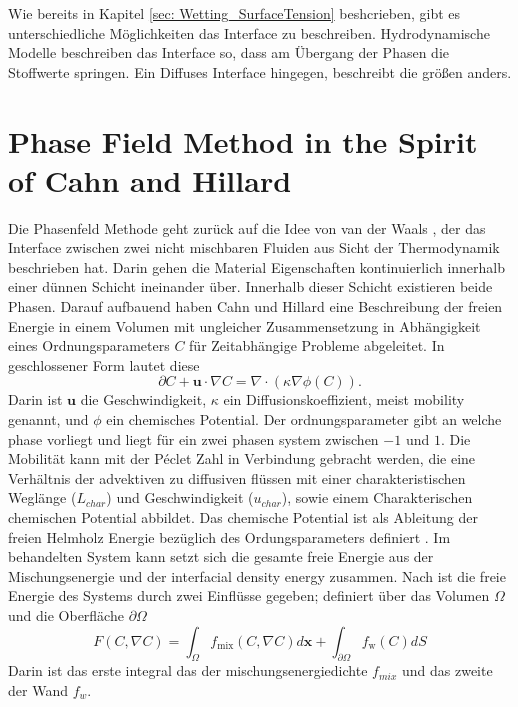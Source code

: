 
Wie bereits in Kapitel \ref{sec: Wetting_SurfaceTension} beshcrieben, gibt es unterschiedliche Möglichkeiten das Interface zu beschreiben. Hydrodynamische Modelle beschreiben das Interface so, dass am Übergang der Phasen die Stoffwerte springen. Ein Diffuses Interface hingegen, beschreibt die größen anders. 

\section{Phase Field Method in the Spirit of Cahn and Hillard}
Die Phasenfeld Methode geht zurück auf die Idee von van der Waals \cite{vanderwaals1979ThermodynamicTheoryCapillarity}, der das Interface zwischen zwei nicht mischbaren Fluiden aus Sicht der Thermodynamik beschrieben hat. Darin gehen die Material Eigenschaften kontinuierlich innerhalb einer dünnen Schicht ineinander über. Innerhalb dieser Schicht existieren beide Phasen. 
Darauf aufbauend haben Cahn und Hillard \cite{johnw.FreeEnergyNonuniform1958} eine Beschreibung der freien Energie in einem Volumen mit ungleicher Zusammensetzung in Abhängigkeit eines Ordnungsparameters $C$ für Zeitabhängige Probleme abgeleitet. In geschlossener Form lautet diese
\begin{equation}
\label{eq: CahnHillard}
    \partial C + \textbf{u} \cdot \nabla C = \nabla \cdot \left(\kappa \nabla \phi(C)\right).
\end{equation}
Darin ist $\textbf{u}$ die Geschwindigkeit, $\kappa$ ein Diffusionskoeffizient, meist mobility genannt, und $\phi$ ein chemisches Potential. Der ordnungsparameter gibt an welche phase vorliegt und liegt für ein zwei phasen system zwischen $-1$ und $1$. Die Mobilität kann mit der Péclet Zahl in Verbindung gebracht werden, die eine Verhältnis der advektiven zu diffusiven flüssen mit einer charakteristischen Weglänge ($L_{char}$) und Geschwindigkeit ($u_{char}$), sowie einem Charakterischen chemischen Potential abbildet\cite{cai2015NumericalSimulationWetting,holzinger2021DirectNumericalSimulation}. 
Das chemische Potential ist als Ableitung der freien Helmholz Energie bezüglich des Ordungsparameters definiert \cite{johnw.FreeEnergyNonuniform1958}. Im behandelten System kann setzt sich die gesamte freie Energie aus der Mischungsenergie und der interfacial density energy zusammen. Nach \cite{yue2010SharpinterfaceLimitCahn} ist die freie Energie des Systems durch zwei Einflüsse gegeben; definiert über das Volumen $\Omega$ und die Oberfläche $\partial\Omega$ 
\begin{equation}
    F(C, \nabla C) = \int_{\Omega} f_{\mathrm{mix}} (C, \nabla C) d\textbf{x}+ \int_{\partial\Omega}f_\mathrm{w}(C) dS
\end{equation}
Darin ist das erste integral das der mischungsenergiedichte $f_{mix}$ und das zweite der Wand $f_w$.

